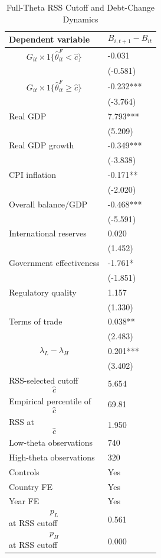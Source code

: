 \begin{table}[H]\centering
\begin{threeparttable}
\caption{Full-Theta RSS Cutoff and Debt-Change Dynamics}
\label{tab:deltaB_rss_cutoff_fulltheta}
\scriptsize
\begin{tabularx}{\textwidth}{lY}
\toprule
Dependent variable & $$B_{i,t+1}-B_{it}$$ \\
\midrule
$$G_{it}\times 1\{\widehat{\theta}^{F}_{it}<\widehat{c}\}$$ & -0.031 \\
 & (-0.581) \\
$$G_{it}\times 1\{\widehat{\theta}^{F}_{it}\geq\widehat{c}\}$$ & -0.232*** \\
 & (-3.764) \\
Real GDP & 7.793*** \\
 & (5.209) \\
Real GDP growth & -0.349*** \\
 & (-3.838) \\
CPI inflation & -0.171** \\
 & (-2.020) \\
Overall balance/GDP & -0.468*** \\
 & (-5.591) \\
International reserves & 0.020 \\
 & (1.452) \\
Government effectiveness & -1.761* \\
 & (-1.851) \\
Regulatory quality & 1.157 \\
 & (1.330) \\
Terms of trade & 0.038** \\
 & (2.483) \\
$$\lambda_L-\lambda_H$$ & 0.201*** \\
 & (3.402) \\
\midrule
RSS-selected cutoff $$\widehat{c}$$ & 5.654 \\
Empirical percentile of $$\widehat{c}$$ & 69.81 \\
RSS at $$\widehat{c}$$ & 1.950 \\
Low-theta observations & 740 \\
High-theta observations & 320 \\
Controls & Yes \\
Country FE & Yes \\
Year FE & Yes \\
$$p_L$$ at RSS cutoff & 0.561 \\
$$p_H$$ at RSS cutoff & 0.000 \\

\end{tabularx}
\end{threeparttable}
\end{table}
